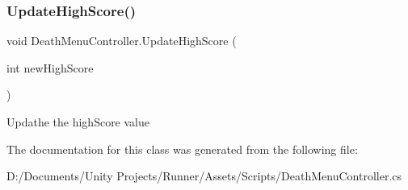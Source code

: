 \subsubsection{\texorpdfstring{Update\+High\+Score()}{UpdateHighScore()}}
{\footnotesize\ttfamily void Death\+Menu\+Controller.\+Update\+High\+Score (\begin{DoxyParamCaption}\item[{int}]{new\+High\+Score }\end{DoxyParamCaption})\hspace{0.3cm}{\ttfamily [private]}}

Updathe the high\+Score value 

The documentation for this class was generated from the following file\+:\begin{DoxyCompactItemize}
\item 
D\+:/\+Documents/\+Unity Projects/\+Runner/\+Assets/\+Scripts/Death\+Menu\+Controller.\+cs\end{DoxyCompactItemize}
